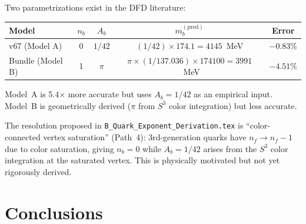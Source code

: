 \documentclass[11pt,a4paper]{article}
\theoremstyle{definition}
\theoremstyle{remark}
\begin{document}
Two parametrizations exist in the DFD literature:

\begin{center}
\begin{tabular}{lcccc}
\toprule
Model & $n_b$ & $A_b$ & $m_b^{(\text{pred})}$ & Error \\
\midrule
v67 (Model A) & 0 & $1/42$ & $(1/42) \times 174.1 = 4145$~MeV & $-0.83\%$ \\
Bundle (Model B) & 1 & $\pi$ & $\pi \times (1/137.036) \times 174100 = 3991$~MeV & $-4.51\%$ \\
\bottomrule
\end{tabular}
\end{center}

Model~A is 5.4$\times$ more accurate but uses $A_b = 1/42$ as an empirical
input.  Model~B is geometrically derived ($\pi$ from $S^3$ color integration)
but less accurate.

The resolution proposed in \texttt{B\_Quark\_Exponent\_Derivation.tex} is
``color-connected vertex saturation'' (Path~4): 3rd-generation quarks have
$n_f \to n_f - 1$ due to color saturation, giving $n_b = 0$ while
$A_b = 1/42$ arises from the $S^3$ color integration at the saturated vertex.
This is physically motivated but not yet rigorously derived.

\section{Conclusions}
\label{sec:conclusions}
\end{document}
